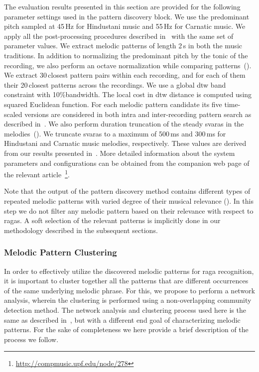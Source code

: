 The evaluation results presented in this section are provided for the following parameter settings used in the pattern discovery block. We use the predominant pitch sampled at 45\,Hz for Hindustani music and 55\,Hz for Carnatic music. We apply all the post-processing procedures described in~ with the same set of parameter values. We extract melodic patterns of length 2\,s in both the music traditions. In addition to normalizing the predominant pitch by the tonic of the recording, we also perform an octave normalization while comparing patterns~(). We extract 30\,closest pattern pairs within each recording, and for each of them their 20\,closest patterns across the recordings. We use a global \gls{dtw} band constraint with 10\%bandwidth. The local cost in \gls{dtw} distance is computed using squared Euclidean function. For each melodic pattern candidate its five time-scaled versions are considered in both intra and inter-recording pattern search as described in~. We also perform duration truncation of the steady \glspl{svara} in the melodies~(). We truncate \glspl{svara} to a maximum of 500\,ms and 300\,ms for Hindustani and Carnatic music melodies, respectively. These values are derived from our results presented in~. More detailed information about the system parameters and configurations can be obtained from the companion web page of the relevant article~\citep{gulatiphrase_2016}\footnote{\url{http://compmusic.upf.edu/node/278}}.

Note that the output of the pattern discovery method contains different types of repeated melodic patterns with varied degree of their musical relevance (). In this step we do not filter any melodic pattern based on their relevance with respect to \glspl{raga}. A soft selection of the relevant patterns is implicitly done in our methodology described in the subsequent sections.


\subsubsection{Melodic Pattern Clustering}
\label{sec:vsm_feature_extraction_pattern_clustering}

In order to effectively utilize the discovered melodic patterns for \gls{raga} recognition, it is important to cluster together all the patterns that are different occurrences of the same underlying melodic phrase. For this, we propose to perform a network analysis, wherein the clustering is performed using a non-overlapping community detection method. The network analysis and clustering process used here is the same as described in~, but with a different end goal of characterizing melodic patterns. For the sake of completeness we here provide a brief description of the process we follow.

